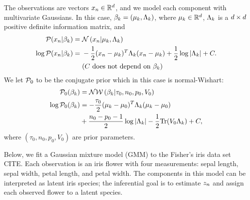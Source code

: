 \begin{ex}
%
The observations are vectors $x_n \in \mathbb{R}^d$,
and we model each component with multivariate Gaussians.
In this case, $\beta_k = (\mu_k, \Lambda_k)$,
where $\mu_k \in \mathbb{R}^d$, $\Lambda_k$ is a $d\times d$ positive
definite information matrix, and
%
\begin{align*}
%
\p(\x_\n \vert \beta_\k) ={}& \normdist{\x_n \vert \mu_\k, \Lambda_\k} \\
\logp(\x_\n \vert \beta_\k) ={}&
    -\frac{1}{2}(\x_n - \mu_k)^T \Lambda_\k (\x_n - \mu_k)
    + \frac{1}{2} \log |\Lambda_\k| + \const.\\
    & \constdesc{\beta_\k}
%
\end{align*}
We let $\mathcal{P}_{0}$ to be the conjugate prior which in this case is normal-Wishart:
\begin{align*}
  \mathcal{P}_{0}(\beta_k) &= \mathcal{N}\mathcal{W}\left(\beta_k \vert \tau_0, n_0, p_0, V_0\right)\\
  \log\mathcal{P}_{0}(\beta_k) &=
      -\frac{\tau_0}{2}(\mu_k - \mu_0)^T \Lambda_k (\mu_k - \mu_0)\\
      &{} + \frac{n_0 - p_0 - 1}{2} \log |\Lambda_k| -
      \frac{1}{2} \textrm{Tr}(V_0 \Lambda_k) + C,
\end{align*}
where $(\tau_0, n_0, p_0, V_0)$ are prior parameters.

Below, we fit a
Gaussian mixture model (GMM) to the Fisher's iris data set CITE.
Each observation is an iris flower with
four measurements:
sepal length, sepal width, petal length, and petal width.
The components in this model can be interpreted as latent iris species;
the inferential goal is to estimate $z_n$ and assign each
observed flower to a latent species.

%
\end{ex}


